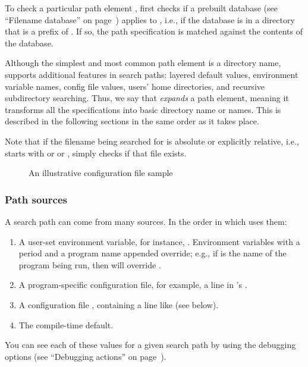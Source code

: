 \documentclass{article}
\begin{document}
To check a particular path element , \KPS{} first checks if a
prebuilt database (see ``Filename data\-base'' on
page~\pageref{sec:filename-database}) applies to , i.e., if the
database is in a directory that is a prefix of .  If so, the path
specification is matched against the contents of the database.

Although the simplest and most common path element is a directory
name, \KPS{} supports additional features in search paths: layered
default values, environment variable names, config file values, users'
home directories, and recursive subdirectory searching.  Thus, we say
that \KPS{} \emph{expands} a path element, meaning it transforms all
the specifications into basic directory name or names.  This is
described in the following sections in the same order as it takes
place.

Note that if the filename being searched for is absolute or explicitly
relative, i.e., starts with \samp{/} or  or ,
\KPS{} simply checks if that file exists.

\ifSingleColumn
\else
\begin{figure*}

\setlength{\abovecaptionskip}{0pt}
  \caption{An illustrative configuration file sample}
  \label{fig:config-sample}
\end{figure*}
\fi

\subsubsection{Path sources}
\label{sec:path-sources}

A search path can come from many sources.  In the order in which
\KPS{} uses them:

\begin{enumerate}
\item
  A user-set environment variable, for instance, \@.
  Environment variables with a period and a program name appended
  override; e.g., if  is the name of the program being run,
  then  will override .
\item
  A program-specific configuration file, for exam\-ple, a line
   in 's .
\item   A \KPS{} configuration file , containing a line like
   (see below).
\item The compile-time default.
\end{enumerate}
\noindent You can see each of these values for a given search path by
using the debugging options (see ``Debugging actions'' on
page~\pageref{sec:debugging}).
\end{document}
